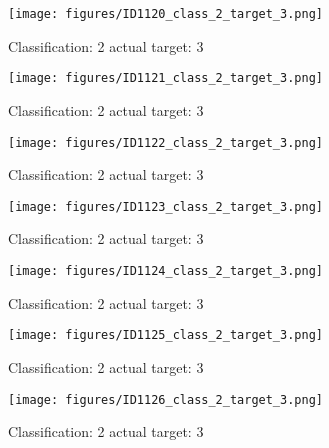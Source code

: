\begin{figure}[h!]
\begin{center}
\texttt{[image: figures/ID1120\_class\_2\_target\_3.png]}
\end{center}
\caption{ Classification: 2 actual target: 3}
\label{fig:ID1120_class_2_target_3}
\end{figure}
\begin{figure}[h!]
\begin{center}
\texttt{[image: figures/ID1121\_class\_2\_target\_3.png]}
\end{center}
\caption{ Classification: 2 actual target: 3}
\label{fig:ID1121_class_2_target_3}
\end{figure}
\begin{figure}[h!]
\begin{center}
\texttt{[image: figures/ID1122\_class\_2\_target\_3.png]}
\end{center}
\caption{ Classification: 2 actual target: 3}
\label{fig:ID1122_class_2_target_3}
\end{figure}
\begin{figure}[h!]
\begin{center}
\texttt{[image: figures/ID1123\_class\_2\_target\_3.png]}
\end{center}
\caption{ Classification: 2 actual target: 3}
\label{fig:ID1123_class_2_target_3}
\end{figure}
\begin{figure}[h!]
\begin{center}
\texttt{[image: figures/ID1124\_class\_2\_target\_3.png]}
\end{center}
\caption{ Classification: 2 actual target: 3}
\label{fig:ID1124_class_2_target_3}
\end{figure}
\begin{figure}[h!]
\begin{center}
\texttt{[image: figures/ID1125\_class\_2\_target\_3.png]}
\end{center}
\caption{ Classification: 2 actual target: 3}
\label{fig:ID1125_class_2_target_3}
\end{figure}
\begin{figure}[h!]
\begin{center}
\texttt{[image: figures/ID1126\_class\_2\_target\_3.png]}
\end{center}
\caption{ Classification: 2 actual target: 3}
\label{fig:ID1126_class_2_target_3}
\end{figure}
